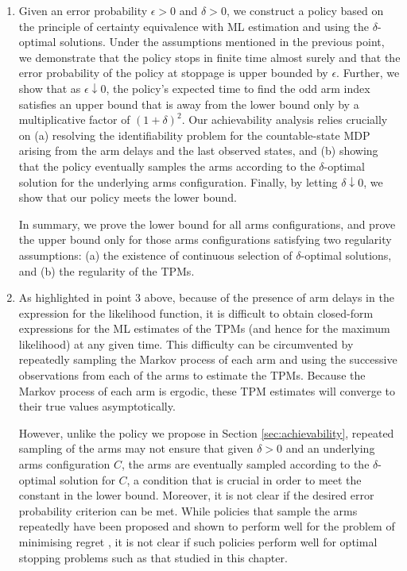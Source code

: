 \begin{enumerate}
	\item Given an error probability $\epsilon>0$ and $\delta>0$, we construct a policy based on the principle of certainty equivalence with ML estimation and using the $\delta$-optimal solutions. Under the assumptions mentioned in the previous point, we demonstrate that the policy stops in finite time almost surely and that the error probability of the policy at stoppage is upper bounded by $\epsilon$. Further, we show that as $\epsilon \downarrow 0$, the policy's expected time to find the odd arm index satisfies an upper bound that is away from the lower bound only by a multiplicative factor of $(1+\delta)^2$. Our achievability analysis relies crucially on (a) resolving the identifiability problem for the countable-state MDP arising from the arm delays and the last observed states, and (b) showing that the policy eventually samples the arms according to the $\delta$-optimal solution for the underlying arms configuration. Finally, by letting $\delta \downarrow 0$, we show that our policy meets the lower bound.
	
	In summary, we prove the lower bound for all arms configurations, and prove the upper bound only for those arms configurations satisfying two regularity assumptions: (a) the existence of continuous selection of $\delta$-optimal solutions, and (b) the regularity of the TPMs.
	\item {\color{black} As highlighted in point 3 above, because of the presence of arm delays in the expression for the likelihood function, it is difficult to obtain closed-form expressions for the ML estimates of the TPMs (and hence for the maximum likelihood) at any given time. This difficulty can be circumvented by repeatedly sampling the Markov process of each arm and using the successive observations from each of the arms to estimate the TPMs. Because the Markov process of each arm is ergodic, these TPM estimates will converge to their true values asymptotically.

 However, unlike the policy we propose in Section \ref{sec:achievability}, repeated sampling of the arms may not ensure that given $\delta>0$ and an underlying arms configuration $C$, the arms are eventually sampled according to the $\delta$-optimal solution for $C$, a condition that is crucial in order to meet the constant in the lower bound. Moreover, it is not clear if the desired error probability criterion can be met. While policies that sample the arms repeatedly have been proposed and shown to perform well for the problem of minimising regret \cite{liu2012learning}, it is not clear if such policies perform well for optimal stopping problems such as that studied in this chapter.
	
}
\end{enumerate}
